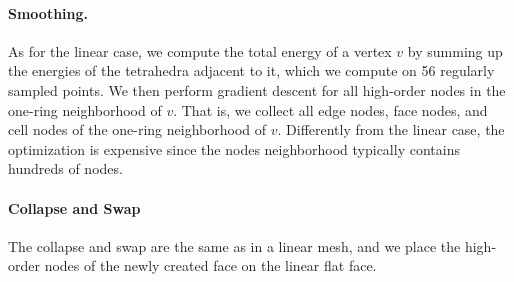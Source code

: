 \paragraph{Smoothing.} As for the linear case, we compute the total energy of a vertex $v$ by summing up the energies of the tetrahedra adjacent to it, which we compute on 56 regularly sampled points. 
We then perform gradient descent {for} all high-order nodes in the one-ring neighborhood of $v$. That is, we collect all edge nodes, face nodes, and cell nodes of the one-ring neighborhood of $v$. Differently {from} the linear case, the optimization is expensive since the nodes neighborhood typically contains hundreds of nodes.

\paragraph{Collapse and Swap}
The collapse and swap are the same as in a linear mesh, and we place the high-order nodes of the newly created face on the linear flat face.